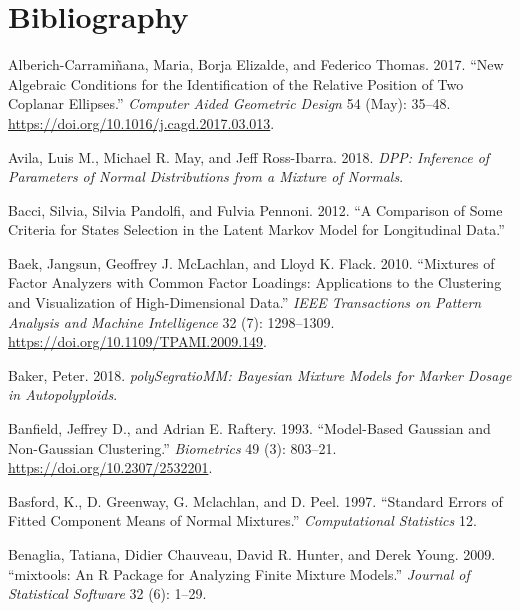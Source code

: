 \hypertarget{bibliography}{%
\section{Bibliography}\label{bibliography}}

\hypertarget{refs}{}
\begin{CSLReferences}{1}{0}
\leavevmode{}%
Alberich-Carramiñana, Maria, Borja Elizalde, and Federico Thomas. 2017. {``New Algebraic Conditions for the Identification of the Relative Position of Two Coplanar Ellipses.''} \emph{Computer Aided Geometric Design} 54 (May): 35--48. \url{https://doi.org/10.1016/j.cagd.2017.03.013}.

\leavevmode{}%
Avila, Luis M., Michael R. May, and Jeff Ross-Ibarra. 2018. \emph{DPP: Inference of Parameters of Normal Distributions from a Mixture of Normals}.

\leavevmode{}%
Bacci, Silvia, Silvia Pandolfi, and Fulvia Pennoni. 2012. {``A Comparison of Some Criteria for States Selection in the Latent {Markov} Model for Longitudinal Data.''}

\leavevmode{}%
Baek, Jangsun, Geoffrey J. McLachlan, and Lloyd K. Flack. 2010. {``Mixtures of {Factor} {Analyzers} with {Common} {Factor} {Loadings}: {Applications} to the {Clustering} and {Visualization} of {High}-{Dimensional} {Data}.''} \emph{IEEE Transactions on Pattern Analysis and Machine Intelligence} 32 (7): 1298--1309. \url{https://doi.org/10.1109/TPAMI.2009.149}.

\leavevmode{}%
Baker, Peter. 2018. \emph{polySegratioMM: Bayesian Mixture Models for Marker Dosage in Autopolyploids}.

\leavevmode{}%
Banfield, Jeffrey D., and Adrian E. Raftery. 1993. {``Model-{Based Gaussian} and {Non-Gaussian Clustering}.''} \emph{Biometrics} 49 (3): 803--21. \url{https://doi.org/10.2307/2532201}.

\leavevmode{}%
Basford, K., D. Greenway, G. Mclachlan, and D. Peel. 1997. {``Standard Errors of Fitted Component Means of Normal Mixtures.''} \emph{Computational Statistics} 12.

\leavevmode{}%
Benaglia, Tatiana, Didier Chauveau, David R. Hunter, and Derek Young. 2009. {``{mixtools}: An {R} Package for Analyzing Finite Mixture Models.''} \emph{Journal of Statistical Software} 32 (6): 1--29.


\end{CSLReferences}
